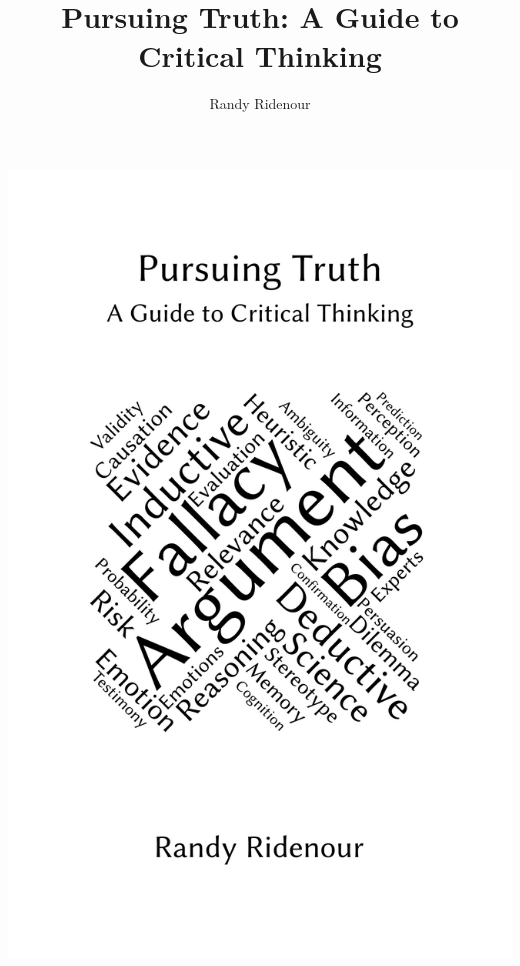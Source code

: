 \documentclass[letterpaper,12pt,oneside,onecolumn]{memoir}
\title{Pursuing Truth: A Guide to Critical Thinking}
\author{Randy Ridenour}
\begin{document}
\frontmatter




\begin{titlingpage}
  \pagestyle{empty}
  \begin{center}
    \includegraphics[height=\textheight]{ct-text-cover.png}
  \end{center}
  \clearpage
\end{titlingpage}

\tableofcontents*



\mainmatter






\printbibliography
\end{document}
